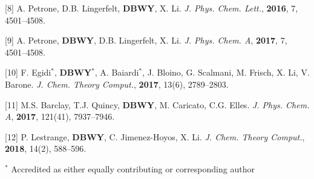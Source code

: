\documentclass[usepdftitle=false]{beamer}
\newcommand{\me}[0]{{\bf DBWY}}
\begin{document}
\begin{frame}
{{      [8] A. Petrone, D.B. Lingerfelt, \me, X. Li.
	\emph{J. Phys. Chem. Lett.}, \textbf{2016}, 7, 4501--4508.

      [9] A. Petrone, \me, D.B. Lingerfelt,  X. Li.
	\emph{J. Phys. Chem. A}, \textbf{2017}, 7, 4501--4508.
      
      [10] F. Egidi$^*$, \me$^*$, A. Baiardi$^*$, J. Bloino, G. Scalmani, M. Frisch, X. Li,
      V. Barone.
	\emph{J. Chem. Theory Comput.}, \textbf{2017}, 13(6), 2789--2803.

      [11] M.S. Barclay, T.J. Quincy, \me, M. Caricato, C.G. Elles.
	\emph{J. Phys. Chem. A}, \textbf{2017}, 121(41), 7937--7946.

      [12] P. Lestrange, \me, C. Jimenez-Hoyos, X. Li.
	\emph{J. Chem. Theory Comput.}, \textbf{2018}, 14(2), 588--596.

      }

  \vspace{0.5cm}
  \begin{minipage}[b]{\textwidth}
    \tiny $^*$ Accredited as either equally contributing or corresponding
    author
  \end{minipage}

    }

\end{frame}
\end{document}
